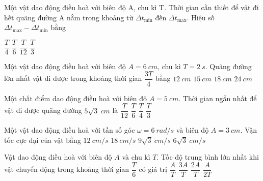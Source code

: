 \begin{ex}%
Một vật dao động điều hoà với biên độ A, chu kì T. Thời gian cần thiết để vật đi hết quãng đường A nằm trong khoảng từ $\Delta t_{\min}$ đến $\Delta t_{\max}$. Hiệu số $\Delta t_{\max} - \Delta t_{\min}$ bằng

\choice
{$\dfrac{T}{4}$}
{\True $\dfrac{T}{6}$}
{$\dfrac{T}{12}$}
{$\dfrac{T}{3}$}

\end{ex} 
\begin{ex}
Một vật dao động điều hoà với biên độ $A = 6\ cm$, chu kì $T = 2\ s$. Quãng đường lớn nhất vật đi được trong khoảng thời gian $\dfrac{3T}{4}$ bằng
\choice
{$12\ cm$}
{$15\ cm$}
{\True $18\ cm$}
{$24\ cm$}
\end{ex}
\begin{ex}
Một chất điểm dao động điều hoà với biên độ $A = 5\ cm$. Thời gian ngắn nhất để vật đi được quãng đường $5\sqrt{3}\ cm$ là
\choice
{$\dfrac{T}{12}$}
{$\dfrac{T}{6}$}
{$\dfrac{T}{4}$}
{\True $\dfrac{T}{3}$}
\end{ex}
\begin{ex}
Một vật dao động điều hoà với tần số góc $\omega = 6\ rad/s$ và biên độ $A = 3\ cm$. Vận tốc cực đại của vật bằng
\choice
{$12\ cm/s$}
{\True $18\ cm/s$}
{$9\sqrt{3}\ cm/s$}
{$6\sqrt{3}\ cm/s$}
\end{ex}
\begin{ex}
Vật dao động điều hoà với biên độ $A$ và chu kì $T$. Tốc độ trung bình lớn nhất khi vật chuyển động trong khoảng thời gian $\dfrac{T}{6}$ có giá trị
\choice
{$\dfrac{A}{T}$}
{$\dfrac{3A}{T}$}
{\True $\dfrac{2A}{T}$}
{$\dfrac{A}{2T}$}
\end{ex}
